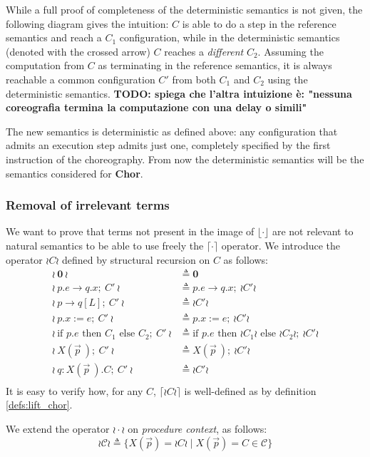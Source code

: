 \documentclass[12pt,a4paper,twoside]{book}
\begin{document}
While a full proof of completeness of the deterministic semantics is not given, the following diagram gives the intuition: $C$ is able to do a step in the reference semantics and reach a $C_1$ configuration, while in the deterministic semantics (denoted with the crossed arrow) $C$ reaches a \emph{different} $C_2$.
Assuming the computation from $C$ as terminating in the reference semantics, it is always reachable a common configuration $C'$ from both $C_1$ and $C_2$ using the deterministic semantics.
\textbf{TODO: spiega che l'altra intuizione è: "nessuna coreografia termina la computazione con una delay o simili"}

The new semantics is deterministic as defined above: any configuration that admits an execution step admits just one, completely specified by the first instruction of the choreography. From now the deterministic semantics will be the semantics considered for \textbf{Chor}.

\subsubsection{Removal of irrelevant terms}
We want to prove that terms not present in the image of $\lfloor \cdot \rfloor$ are not relevant to natural semantics to be able to use freely the $\lceil \cdot \rceil$ operator. We introduce the operator $\wr C \wr$ defined by structural recursion on $C$ as follows:
\begin{align*}
	\wr~\boldsymbol{0}~\wr &\triangleq \boldsymbol{0} \\
	\wr~p.e \rightarrow q.x;~ C'~\wr &\triangleq p.e \rightarrow q.x;~ \wr C' \wr \\
	\wr~p \rightarrow q[L];~ C'~\wr &\triangleq \wr C' \wr \\
	\wr~p.x := e;~ C'~\wr &\triangleq p.x := e;~ \wr C' \wr \\
	\wr~\text{if } p.e \text{ then } C_1 \text{ else } C_2;~ C'~\wr &\triangleq \text{if } p.e \text{ then } \wr C_1\wr \text{ else } \wr C_2\wr ;~ \wr C'\wr \\
	\wr~X(\vec{p}~);~ C'~\wr &\triangleq X(\vec{p}~);~ \wr C' \wr \\
	\wr~q : X(\vec{p}~).C;~ C'~\wr &\triangleq \wr C' \wr \\
\end{align*}
It is easy to verify how, for any $C$, $\lceil \wr C \wr \rceil$ is well-defined as by definition \ref{defs:lift_chor}.

We extend the operator $\wr \cdot \wr$ on \emph{procedure context}, as follows:
$$
\wr\mathscr{C}\wr \triangleq
\{X(\vec{p}) = \wr C \wr \mid X(\vec{p}) = C \in \mathscr{C}\}
$$
\end{document}
